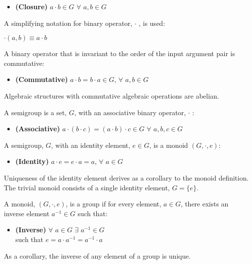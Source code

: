 \documentclass[aps,twocolumn,secnumarabic,nobalancelastpage,amsmath,amssymb,
nofootinbib,parskip=full]{revtex4}
\begin{document}
\begin{itemize}
\item \textbf{\small (Closure)} $a\cdot b\in G$ $\forall$ $a,b\in G$
\end{itemize}

A simplifying notation for binary operator, $\cdot$ , is used:

\begin{center}
 $\cdot(a,b)\equiv a\cdot b$
\end{center}

A binary operator that is invariant to the order of the input argument pair
is commutative:

\begin{itemize}
\item \textbf{\small (Commutative)} $a\cdot b=b\cdot a\in G$, $\forall$ $a,b\in G$
\end{itemize}

Algebraic structures with commutative algebraic operations are abelian.

A semigroup is a set, $G$, with an associative binary operator, $\cdot$ :

\begin{itemize}
\item \textbf{\small (Associative)}
  $a\cdot (b\cdot c) = (a\cdot b)\cdot c\in G$ $\forall$ $a,b,c\in G$
\end{itemize}

A semigroup, $G$, with an identity element, $e\in G$, is a monoid $(G,\cdot,e)$:

\begin{itemize}
\item \textbf{\small (Identity)} $a\cdot e=e\cdot a=a$, $\forall$ $a \in G$
\end{itemize}

Uniqueness of the identity element derives as a corollary to the monoid definition.
The trivial monoid consists of a single identity element, $G=\{e\}$.

A monoid, $(G,\cdot,e)$, is a group if for every element, $a\in G$, 
there exists an inverse element $a^{-1}\in G$ such that:

\begin{itemize}
\item \textbf{\small (Inverse)} $\forall$ $a\in G$ $\exists$ $a^{-1}\in G$ \\
  such that $e=a\cdot a^{-1}=a^{-1}\cdot a$
\end{itemize}

As a corollary, the inverse of any element of a group is unique.
\end{document}
